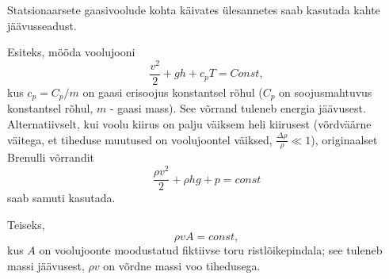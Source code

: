 \documentclass[a4paper,11pt,twocolumn]{article}
\begin{document}
Statsionaarsete gaasivoolude kohta käivates ülesannetes saab kasutada kahte jäävusseadust.

Esiteks, mööda voolujooni
\[ \frac{v^2}{2}+gh+c_pT=Const, \]
kus \( c_p=C_p/m \) on gaasi erisoojus konstantsel rõhul (\( C_p \) on soojusmahtuvus konstantsel rõhul, \( m \) - gaasi mass). See võrrand tuleneb energia jäävusest. Alternatiivselt, kui voolu kiirus on palju väiksem heli kiirusest (võrdväärne väitega, et tiheduse muutused on voolujoontel väiksed, \( \frac{\Delta \rho}{\rho}\ll 1 \)), originaalset Brenulli võrrandit
\[ \frac{\rho v^2}{2}+\rho hg+p=const \]
saab samuti kasutada.

Teiseks,
\[ \rho v A=const ,\]
kus \( A \) on voolujoonte moodustatud fiktiivse toru ristlõikepindala; see tuleneb massi jäävusest, \( \rho v \) on võrdne massi voo tihedusega.
\end{document}
